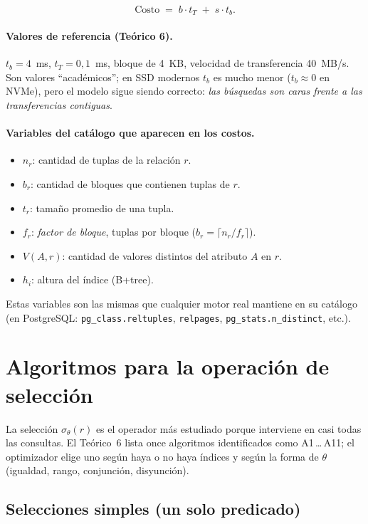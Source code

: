 \documentclass[11pt,a4paper]{article}
\newcommand{\sel}[1]{\sigma_{#1}}
\begin{document}
\[
\text{Costo} \;=\; b \cdot t_T \;+\; s \cdot t_b .
\]

\paragraph{Valores de referencia (Teórico 6).}
$t_b = 4$~ms, $t_T = 0{,}1$~ms, bloque de 4~KB, velocidad de transferencia
40~MB/s. Son valores ``académicos''; en SSD modernos $t_b$ es mucho menor
($t_b \approx 0$ en NVMe), pero el modelo sigue siendo correcto: \emph{las
búsquedas son caras frente a las transferencias contiguas}.

\paragraph{Variables del catálogo que aparecen en los costos.}
\begin{itemize}
    \item $n_r$: cantidad de tuplas de la relación $r$.
    \item $b_r$: cantidad de bloques que contienen tuplas de $r$.
    \item $t_r$: tamaño promedio de una tupla.
    \item $f_r$: \emph{factor de bloque}, tuplas por bloque ($b_r = \lceil n_r/f_r\rceil$).
    \item $V(A,r)$: cantidad de valores distintos del atributo $A$ en $r$.
    \item $h_i$: altura del índice (B+tree).
\end{itemize}

Estas variables son las mismas que cualquier motor real mantiene en su
catálogo (en PostgreSQL: \texttt{pg\_class.reltuples}, \texttt{relpages},
\texttt{pg\_stats.n\_distinct}, etc.).

\section{Algoritmos para la operación de selección}

La selección $\sel{\theta}(r)$ es el operador más estudiado porque interviene
en casi todas las consultas. El Teórico~6 lista once algoritmos identificados
como A1\,\ldots\,A11; el optimizador elige uno según haya o no haya índices
y según la forma de $\theta$ (igualdad, rango, conjunción, disyunción).

\subsection{Selecciones simples (un solo predicado)}
\end{document}

